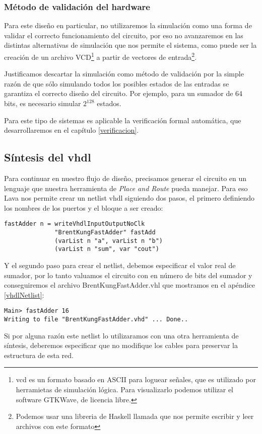 \subsubsection{Método de validación del hardware}
Para este diseño en particular, no utilizaremos la simulación como una forma de validar el correcto funcionamiento del circuito, por eso no avanzaremos en las distintas alternativas de simulación que nos permite el sistema, como puede ser la creación de un archivo VCD\footnote{\gls{vcd} es un formato basado en ASCII para loguear señales, que es utilizado por herramietas de simulación lógica. Para visualizarlo podemos utilizar el software GTKWave, de licencia libre.} a partir de vectores de entrada\footnote{Podemos usar una libreria de Haskell llamada  que nos permite escribir y leer archivos con este formato}.

Justificamos descartar la simulación como método de validación por la simple razón de que sólo simulando todos los posibles estados de las entradas se garantiza el correcto diseño del circuito. Por ejemplo, para un sumador de 64 bits, es necesario simular $2^{128}$ estados.

Para este tipo de sistemas es aplicable la verificación formal automática, que desarrollaremos en el capítulo \ref{verificacion}.

\subsection{Síntesis del  \gls{vhdl}}

Para continuar en nuestro flujo de diseño, precisamos generar el circuito en un lenguaje que nuestra herramienta de \emph{Place and Route} pueda manejar. Para eso Lava nos permite crear un netlist \gls{vhdl} siguiendo dos pasos, el primero definiendo los nombres de los puertos y el bloque a ser creado:
\begin{lstlisting}
fastAdder n = writeVhdlInputOutputNoClk
              "BrentKungFastAdder" fastAdd
              (varList n "a", varList n "b")
              (varList n "sum", var "cout")
\end{lstlisting}

Y el segundo paso para crear el netlist, debemos especificar el valor real de sumador, por lo tanto valuamos el circuito con en número de bits del sumador y conseguiremos el archivo BrentKungFastAdder.vhl que mostramos en el apéndice \ref{vhdlNetlist}:
\begin{lstlisting}
Main> fastAdder 16
Writing to file "BrentKungFastAdder.vhd" ... Done..
\end{lstlisting}

\noindent Si por alguna razón este netlist lo utilizaramos con una otra herramienta de síntesis, deberemos especificar que no modifique los cables para preservar la estructura de esta red.

